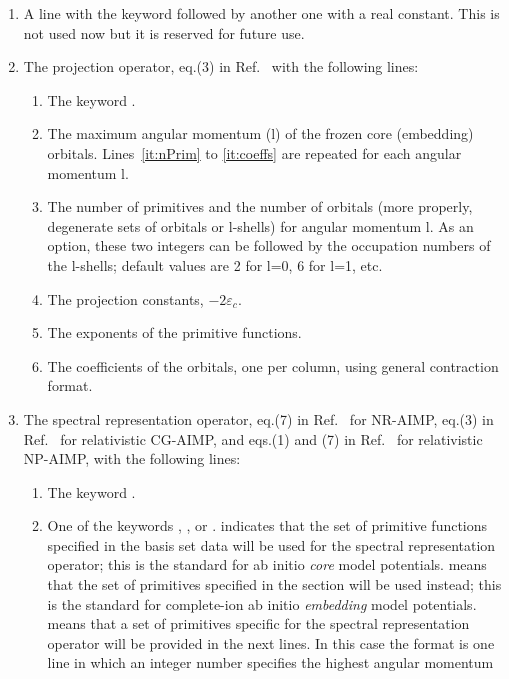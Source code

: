 \begin{enumerate}
\begin{enumerate}
\end{enumerate}
%
\item A line with the keyword 
followed by another one with a real constant.
This is not used now but it is reserved for future use.
\item The projection operator, eq.(3) in Ref.~\cite{Huzinaga:87}
with the following lines:
\begin{enumerate}
\item The keyword .
\item The maximum angular momentum (l)
of the frozen core (embedding) orbitals.
Lines~\ref{it:nPrim} to \ref{it:coeffs} are repeated for 
each angular momentum l.
\item \label{it:nPrim} The number of primitives and the number of orbitals
(more properly, degenerate sets of orbitals or l-shells)
for angular momentum l.
As an option, these two integers can be followed by the occupation numbers
of the l-shells; default values are 2 for l=0, 6 for l=1, etc.
\item The projection constants, $-2\varepsilon_c$.
\item The exponents of the primitive functions.
\item \label{it:coeffs} The coefficients of the orbitals, one per column,
using general contraction format.
\end{enumerate}
\item The spectral representation operator,
eq.(7) in Ref.~\cite{Huzinaga:87} for NR-AIMP,
eq.(3) in Ref.~\cite{Barandiaran:90} for relativistic CG-AIMP,
and eqs.(1) and (7) in Ref.~\cite{Rakowitz:99b} for relativistic NP-AIMP,
with the following lines:
\begin{enumerate}
\item The keyword .
\item One of the keywords
, , or .
 indicates that the set of primitive functions specified
in the basis set data will be used for the spectral representation
operator;
this is the standard for ab initio {\it core} model potentials.
 means that the set of primitives specified
in the  section will be used instead;
this is the standard for complete-ion ab initio {\it embedding} model
potentials.
 means that a set of primitives specific for the
spectral representation operator will be provided in the next lines.
In this case the format is
one line in which an integer number specifies the highest angular momentum

\end{enumerate}
\end{enumerate}
